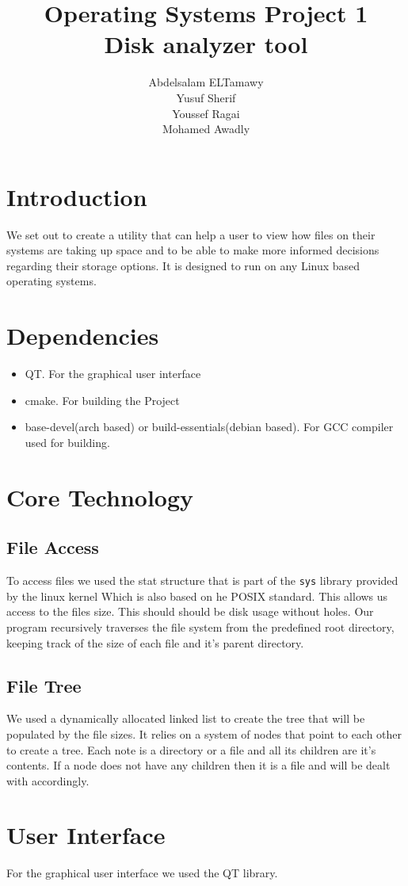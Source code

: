 \documentclass[]{article}
\author{Abdelsalam ELTamawy\\Yusuf Sherif\\Youssef Ragai\\Mohamed Awadly}
\title{Operating Systems Project 1\\Disk analyzer tool}
\begin{document}
	\begin{titlepage}
	
		\maketitle
	\end{titlepage}

	\section{Introduction}
	We set out to create a utility that can help a user to view how files on their systems are taking up space and to be able to make more informed decisions regarding their storage options.
	It is designed to run on any Linux based operating systems.
	
	\section{Dependencies}
	\begin{itemize}
		\item QT. For the graphical user interface
		\item cmake. For building the Project
		\item base-devel(arch based) or build-essentials(debian based). For GCC compiler used for building.
	\end{itemize}

	\section{Core Technology}
	\subsection{File Access}
	To access files we used the stat structure that is part of the \texttt{sys} library provided by the linux kernel Which is also based on he POSIX standard.
	This allows us access to the files size. This should should be disk usage without holes. Our program recursively traverses the file system from the predefined root directory, keeping track of the size of each file and it's parent directory.

	\subsection{File Tree}
	We used a dynamically allocated linked list to create the tree that will be populated by the file sizes. It relies on a system of nodes that point to each other to create a tree. Each note is a directory or a file and all its children are it's contents.
	If a node does not have any children then it is a file and will be dealt with accordingly.

	\section{User Interface}
	For the graphical user interface we used the QT library.
\end{document}
